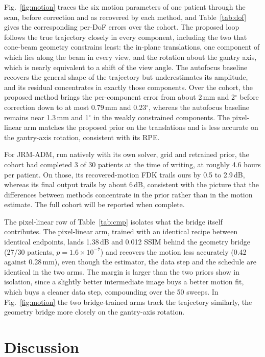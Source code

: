\documentclass[11pt]{article}
\begin{document}
Fig.~\ref{fig:motion} traces the six motion parameters of one patient through the scan,
before correction and as recovered by each method, and Table~\ref{tab:dof} gives the
corresponding per-DoF errors over the cohort. The proposed loop follows the true
trajectory closely in every component, including the two that cone-beam geometry
constrains least: the in-plane translations, one component of which lies along the beam
in every view, and the rotation about the gantry axis, which is nearly equivalent to a
shift of the view angle. The autofocus baseline recovers the general shape of the
trajectory but underestimates its amplitude, and its residual concentrates in exactly
those components. Over the cohort, the proposed method brings the per-component error
from about 2\,mm and 2$^\circ$ before correction down to at most 0.79\,mm and
0.23$^\circ$, whereas the autofocus baseline remains near 1.3\,mm and 1$^\circ$ in the
weakly constrained components. The pixel-linear arm matches the proposed prior on the
translations and is less accurate on the gantry-axis rotation, consistent with its RPE.

For JRM-ADM, run natively with its own solver, grid and retrained prior, the cohort had
completed 3 of 30 patients at the time of writing, at roughly 4.6 hours per patient. On
those, its recovered-motion FDK trails ours by 0.5 to 2.9\,dB, whereas its final output
trails by about 6\,dB, consistent with the picture that the differences between methods
concentrate in the prior rather than in the motion estimate. The full cohort will be
reported when complete.

The pixel-linear row of Table~\ref{tab:cmp} isolates what the bridge itself contributes. The
pixel-linear arm, trained with an identical recipe between identical endpoints, lands
1.38\,dB and 0.012 SSIM behind the geometry bridge (27/30 patients,
$p=1.6\times10^{-7}$) and recovers the motion less accurately (0.42 against 0.28\,mm),
even though the estimator, the data step and the schedule are identical in the two arms.
The margin is larger than the two priors show in isolation, since a slightly better
intermediate image buys a better motion fit, which buys a cleaner data step, compounding
over the 50 sweeps. In Fig.~\ref{fig:motion} the two bridge-trained arms track the
trajectory similarly, the geometry bridge more closely on the gantry-axis rotation.

\FloatBarrier
\section{Discussion}
\label{sec:discussion}
\end{document}
